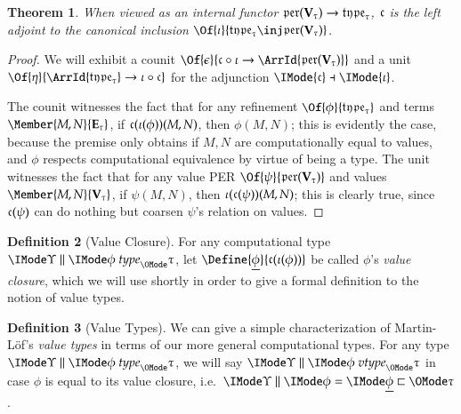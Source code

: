 \documentclass[11pt]{article}
\newtheorem{thm}{Theorem}[section]
\theoremstyle{definition}
\newtheorem{definition}[thm]{Definition}
\theoremstyle{notation}
\theoremstyle{remark}
\numberwithin{equation}{section}
\newcommand\Exprs{\mathbf{E}}
\newcommand\Values{\mathbf{V}}
\begin{document}
\begin{thm}
When viewed as an internal functor
$\PERs{\Values_\tau}\to\Types{\tau}$, $\mathfrak{c}$ is the left adjoint to
the canonical inclusion
$\Of{\iota}{\Types{\tau}\inj\PERs{\Values_\tau}}$.
\end{thm}
\begin{proof}
  We will exhibit a counit $\Of{\epsilon}{\VToCType\circ\iota\to
  \ArrId{\PERs{\Values_\tau}}}$ and a unit
  $\Of{\eta}{\ArrId{\Types{\tau}}\to\iota\circ\VToCType}$ for
  the adjunction $\IMode{\VToCType}\dashv\IMode{\iota}$.

  The counit witnesses the fact that for any refinement
  $\Of{\phi}{\Types{\tau}}$ and terms $\Member{M,N}{\Exprs_\tau}$, if
  $\mathfrak{c}(\iota(\phi))(M,N)$, then $\phi(M,N)$; this is evidently the case,
  because the premise only obtains if $M,N$ are computationally equal to
  values, and $\phi$ respects computational equivalence by virtue of being a
  type.  The unit witnesses the fact that for any value PER
  $\Of{\psi}{\PERs{\Values_\tau}}$ and values $\Member{M,N}{\Values_\tau}$, if
  $\psi(M,N)$, then $\iota(\mathfrak{c}(\psi))(M,N)$; this is clearly true, since
  $\mathfrak{c}(\psi)$ can do nothing but coarsen $\psi$'s relation on values.

\end{proof}

\begin{definition}[Value Closure]
  For any computational type $\IsType{\Upsilon}{\phi}{\tau}$, let
  $\Define{\underline{\phi}}{\VToCType(\iota(\phi))}$ be called $\phi$'s
  \emph{value closure}, which we will use shortly in order to give a formal definition
  to the notion of value types.
\end{definition}

\begin{definition}[Value Types]
  We can give a simple characterization of Martin-L\"of's \emph{value types} in
  terms of our more general computational types. For any type $\IsType{\Upsilon}{\phi}{\tau}$,
  we will say $\IsValueType{\Upsilon}{\phi}{\tau}$ in case $\phi$ is equal to
  its value closure, i.e.\ $\EqRefines{\Upsilon}{\phi}{\underline{\phi}}{\tau}$.
\end{definition}

\ifdraft{}{
  \newpage
  \nocite{maclane:1971}
  
  
}
\end{document}
